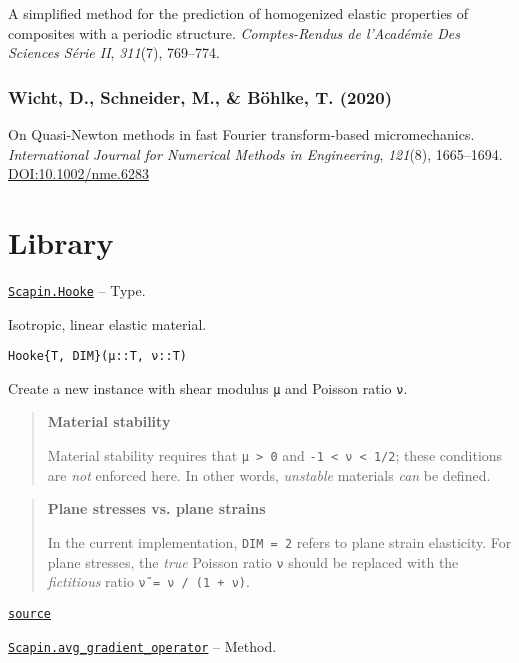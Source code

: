 \documentclass[oneside]{memoir}
\begin{document}
A simplified method for the prediction of homogenized elastic properties of composites with a periodic structure. \emph{Comptes-Rendus de l’Académie Des Sciences Série II}, \emph{311}(7), 769–774.



\hypertarget{10620780704054356859}{}


\section{Wicht, D., Schneider, M., \& Böhlke, T. (2020)}



On Quasi-Newton methods in fast Fourier transform-based micromechanics. \emph{International Journal for Numerical Methods in Engineering}, \emph{121}(8), 1665–1694. \href{https://doi.org/10.1002/nme.6283}{DOI:10.1002/nme.6283}



\part{Library}

\hypertarget{8158906180689097333}{} 
\hyperlink{8158906180689097333}{\texttt{Scapin.Hooke}}  -- {Type.}

\begin{adjustwidth}{2em}{0pt}

Isotropic, linear elastic material.


\begin{lstlisting}
Hooke{T, DIM}(μ::T, ν::T)
\end{lstlisting}

Create a new instance with shear modulus \texttt{μ} and Poisson ratio \texttt{ν}.

\begin{quote}
\textbf{Material stability}

Material stability requires that \texttt{μ > 0} and \texttt{-1 < ν < 1/2}; these conditions are \emph{not} enforced here. In other words, \emph{unstable} materials \emph{can} be defined.

\end{quote}
\begin{quote}
\textbf{Plane stresses vs. plane strains}

In the current implementation, \texttt{DIM = 2} refers to plane strain elasticity. For plane stresses, the \emph{true} Poisson ratio \texttt{ν} should be replaced with the \emph{fictitious} ratio \texttt{ν̃ = ν / (1 + ν)}.

\end{quote}


\href{https://github.com/sbrisard/Scapin.jl/blob/ea3f90c60e90cdf214e41b1314a8ee608e0b8d10/src/hooke.jl#L1-L18}{\texttt{source}}


\end{adjustwidth}
\hypertarget{11552838231886230083}{} 
\hyperlink{11552838231886230083}{\texttt{Scapin.avg\_gradient\_operator}}  -- {Method.}
\end{document}
